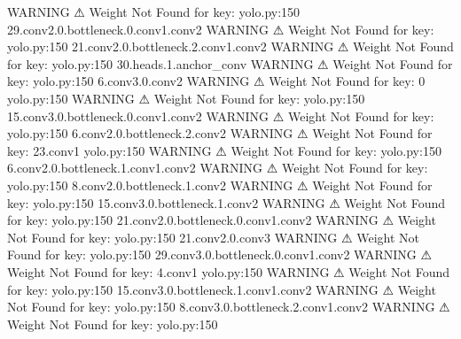                     WARNING  ⚠ Weight Not Found for key:               yolo.py:150
                             29.conv2.0.bottleneck.0.conv1.conv2                  
                    WARNING  ⚠ Weight Not Found for key:               yolo.py:150
                             21.conv2.0.bottleneck.2.conv1.conv2                  
                    WARNING  ⚠ Weight Not Found for key:               yolo.py:150
                             30.heads.1.anchor_conv                               
                    WARNING  ⚠ Weight Not Found for key:               yolo.py:150
                             6.conv3.0.conv2                                      
                    WARNING  ⚠ Weight Not Found for key: 0             yolo.py:150
                    WARNING  ⚠ Weight Not Found for key:               yolo.py:150
                             15.conv3.0.bottleneck.0.conv1.conv2                  
                    WARNING  ⚠ Weight Not Found for key:               yolo.py:150
                             6.conv2.0.bottleneck.2.conv2                         
                    WARNING  ⚠ Weight Not Found for key: 23.conv1      yolo.py:150
                    WARNING  ⚠ Weight Not Found for key:               yolo.py:150
                             6.conv2.0.bottleneck.1.conv1.conv2                   
                    WARNING  ⚠ Weight Not Found for key:               yolo.py:150
                             8.conv2.0.bottleneck.1.conv2                         
                    WARNING  ⚠ Weight Not Found for key:               yolo.py:150
                             15.conv3.0.bottleneck.1.conv2                        
                    WARNING  ⚠ Weight Not Found for key:               yolo.py:150
                             21.conv2.0.bottleneck.0.conv1.conv2                  
                    WARNING  ⚠ Weight Not Found for key:               yolo.py:150
                             21.conv2.0.conv3                                     
                    WARNING  ⚠ Weight Not Found for key:               yolo.py:150
                             29.conv3.0.bottleneck.0.conv1.conv2                  
                    WARNING  ⚠ Weight Not Found for key: 4.conv1       yolo.py:150
                    WARNING  ⚠ Weight Not Found for key:               yolo.py:150
                             15.conv3.0.bottleneck.1.conv1.conv2                  
                    WARNING  ⚠ Weight Not Found for key:               yolo.py:150
                             8.conv3.0.bottleneck.2.conv1.conv2                   
                    WARNING  ⚠ Weight Not Found for key:               yolo.py:150
